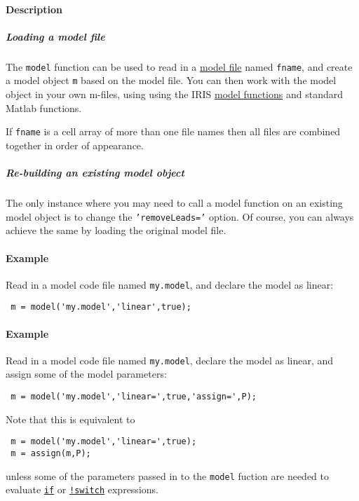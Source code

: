  \paragraph{Description}
 
 \subparagraph{Loading a model file}
 
 The \texttt{model} function can be used to read in a
 \href{modellang/Contents}{model file} named \texttt{fname}, and create a
 model object \texttt{m} based on the model file. You can then work with
 the model object in your own m-files, using using the IRIS
 \href{model/Contents}{model functions} and standard Matlab functions.
 
 If \texttt{fname} is a cell array of more than one file names then all
 files are combined together in order of appearance.
 
 \subparagraph{Re-building an existing model object}
 
 The only instance where you may need to call a model function on an
 existing model object is to change the \texttt{'removeLeads='} option.
 Of course, you can always achieve the same by loading the original model
 file.
 
 \paragraph{Example}
 
 Read in a model code file named \texttt{my.model}, and declare the model
 as linear:
 
 \begin{verbatim}
 m = model('my.model','linear',true);
 \end{verbatim}
 
 \paragraph{Example}
 
 Read in a model code file named \texttt{my.model}, declare the model as
 linear, and assign some of the model parameters:
 
 \begin{verbatim}
 m = model('my.model','linear=',true,'assign=',P);
 \end{verbatim}
 
 Note that this is equivalent to
 
 \begin{verbatim}
 m = model('my.model','linear=',true);
 m = assign(m,P);
 \end{verbatim}
 
 unless some of the parameters passed in to the \texttt{model} fuction
 are needed to evaluate \href{modellang/if}{\texttt{if}} or
 \href{modellang/switch}{\texttt{!switch}} expressions.



